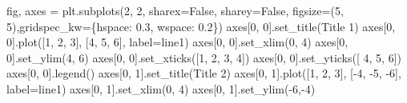 \documentclass[
  letterpaper,
]{article}
\newenvironment{Shaded}{\begin{snugshade}}{\end{snugshade}}
\newcommand{\DecValTok}[1]{\textcolor[rgb]{0.68,0.00,0.00}{#1}}
\newcommand{\FloatTok}[1]{\textcolor[rgb]{0.68,0.00,0.00}{#1}}
\newcommand{\NormalTok}[1]{\textcolor[rgb]{0.00,0.23,0.31}{#1}}
\newcommand{\OperatorTok}[1]{\textcolor[rgb]{0.37,0.37,0.37}{#1}}
\newcommand{\StringTok}[1]{\textcolor[rgb]{0.13,0.47,0.30}{#1}}
\newcommand{\VariableTok}[1]{\textcolor[rgb]{0.07,0.07,0.07}{#1}}
\begin{document}
\begin{Shaded}
\begin{Highlighting}[]
\NormalTok{fig, axes }\OperatorTok{=}\NormalTok{ plt.subplots(}\DecValTok{2}\NormalTok{, }\DecValTok{2}\NormalTok{, sharex}\OperatorTok{=}\VariableTok{False}\NormalTok{, sharey}\OperatorTok{=}\VariableTok{False}\NormalTok{, figsize}\OperatorTok{=}\NormalTok{(}\DecValTok{5}\NormalTok{, }\DecValTok{5}\NormalTok{),gridspec\_kw}\OperatorTok{=}\NormalTok{\{}\StringTok{\textquotesingle{}hspace\textquotesingle{}}\NormalTok{: }\FloatTok{0.3}\NormalTok{, }\StringTok{\textquotesingle{}wspace\textquotesingle{}}\NormalTok{: }\FloatTok{0.2}\NormalTok{\})}
\NormalTok{axes[}\DecValTok{0}\NormalTok{, }\DecValTok{0}\NormalTok{].set\_title(}\StringTok{\textquotesingle{}Title 1\textquotesingle{}}\NormalTok{)}
\NormalTok{axes[}\DecValTok{0}\NormalTok{, }\DecValTok{0}\NormalTok{].plot([}\DecValTok{1}\NormalTok{, }\DecValTok{2}\NormalTok{, }\DecValTok{3}\NormalTok{], [}\DecValTok{4}\NormalTok{, }\DecValTok{5}\NormalTok{, }\DecValTok{6}\NormalTok{], label}\OperatorTok{=}\StringTok{\textquotesingle{}line1\textquotesingle{}}\NormalTok{)}
\NormalTok{axes[}\DecValTok{0}\NormalTok{, }\DecValTok{0}\NormalTok{].set\_xlim(}\DecValTok{0}\NormalTok{, }\DecValTok{4}\NormalTok{)}
\NormalTok{axes[}\DecValTok{0}\NormalTok{, }\DecValTok{0}\NormalTok{].set\_ylim(}\DecValTok{4}\NormalTok{, }\DecValTok{6}\NormalTok{)}
\NormalTok{axes[}\DecValTok{0}\NormalTok{, }\DecValTok{0}\NormalTok{].set\_xticks([}\DecValTok{1}\NormalTok{, }\DecValTok{2}\NormalTok{, }\DecValTok{3}\NormalTok{, }\DecValTok{4}\NormalTok{])}
\NormalTok{axes[}\DecValTok{0}\NormalTok{, }\DecValTok{0}\NormalTok{].set\_yticks([ }\DecValTok{4}\NormalTok{, }\DecValTok{5}\NormalTok{, }\DecValTok{6}\NormalTok{])}
\NormalTok{axes[}\DecValTok{0}\NormalTok{, }\DecValTok{0}\NormalTok{].legend()}
\NormalTok{axes[}\DecValTok{0}\NormalTok{, }\DecValTok{1}\NormalTok{].set\_title(}\StringTok{\textquotesingle{}Title 2\textquotesingle{}}\NormalTok{)}
\NormalTok{axes[}\DecValTok{0}\NormalTok{, }\DecValTok{1}\NormalTok{].plot([}\DecValTok{1}\NormalTok{, }\DecValTok{2}\NormalTok{, }\DecValTok{3}\NormalTok{], [}\OperatorTok{{-}}\DecValTok{4}\NormalTok{, }\OperatorTok{{-}}\DecValTok{5}\NormalTok{, }\OperatorTok{{-}}\DecValTok{6}\NormalTok{], label}\OperatorTok{=}\StringTok{\textquotesingle{}line1\textquotesingle{}}\NormalTok{)}
\NormalTok{axes[}\DecValTok{0}\NormalTok{, }\DecValTok{1}\NormalTok{].set\_xlim(}\DecValTok{0}\NormalTok{, }\DecValTok{4}\NormalTok{)}
\NormalTok{axes[}\DecValTok{0}\NormalTok{, }\DecValTok{1}\NormalTok{].set\_ylim(}\OperatorTok{{-}}\DecValTok{6}\NormalTok{,}\OperatorTok{{-}}\DecValTok{4}\NormalTok{)}

\end{Highlighting}
\end{Shaded}
\end{document}
